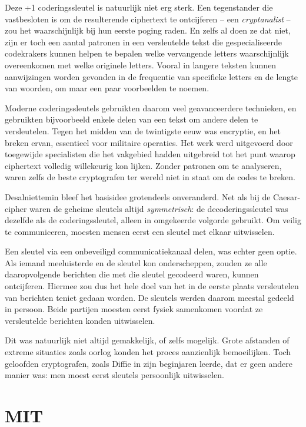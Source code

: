 \documentclass[
  a5paper,
  smalldemyvopaper,11pt,twoside,onecolumn,openright,extrafontsizes,
hidelinks]{memoir}
\begin{document}
Deze +1 coderingssleutel is natuurlijk niet erg sterk. Een tegenstander
die vastbesloten is om de resulterende ciphertext te ontcijferen -- een
\emph{cryptanalist} -- zou het waarschijnlijk bij hun eerste poging
raden. En zelfs al doen ze dat niet, zijn er toch een aantal patronen in
een versleutelde tekst die gespecialiseerde codekrakers kunnen helpen te
bepalen welke vervangende letters waarschijnlijk overeenkomen met welke
originele letters. Vooral in langere teksten kunnen aanwijzingen worden
gevonden in de frequentie van specifieke letters en de lengte van
woorden, om maar een paar voorbeelden te noemen.

Moderne coderingssleutels gebruikten daarom veel geavanceerdere
technieken, en gebruikten bijvoorbeeld enkele delen van een tekst om
andere delen te versleutelen. Tegen het midden van de twintigste eeuw
was encryptie, en het breken ervan, essentieel voor militaire operaties.
Het werk werd uitgevoerd door toegewijde specialisten die het vakgebied
hadden uitgebreid tot het punt waarop ciphertext volledig willekeurig
kon lijken. Zonder patronen om te analyseren, waren zelfs de beste
cryptografen ter wereld niet in staat om de codes te breken.

Desalniettemin bleef het basisidee grotendeels onveranderd. Net als bij
de Caesar-cipher waren de geheime sleutels altijd \emph{symmetrisch}: de
decoderingssleutel was dezelfde als de coderingssleutel, alleen in
omgekeerde volgorde gebruikt. Om veilig te communiceren, moesten mensen
eerst een sleutel met elkaar uitwisselen.

Een sleutel via een onbeveiligd communicatiekanaal delen, was echter
geen optie. Als iemand meeluisterde en de sleutel kon onderscheppen,
zouden ze alle daaropvolgende berichten die met die sleutel gecodeerd
waren, kunnen ontcijferen. Hiermee zou dus het hele doel van het in de
eerste plaats versleutelen van berichten teniet gedaan worden. De
sleutels werden daarom meestal gedeeld in persoon. Beide partijen
moesten eerst fysiek samenkomen voordat ze versleutelde berichten konden
uitwisselen.

Dit was natuurlijk niet altijd gemakkelijk, of zelfs mogelijk. Grote
afstanden of extreme situaties zoals oorlog konden het proces
aanzienlijk bemoeilijken. Toch geloofden cryptografen, zoals Diffie in
zijn beginjaren leerde, dat er geen andere manier was: men moest eerst
sleutels persoonlijk uitwisselen.

\section{MIT}\label{mit}
\end{document}
